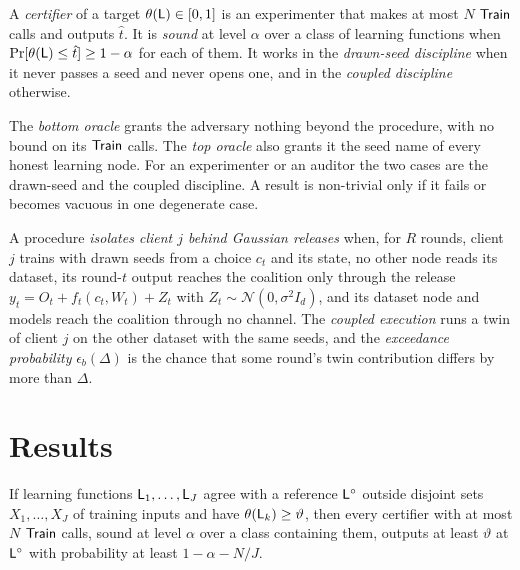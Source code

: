 \begin{definition}[Certifier]
A \emph{certifier} of a target $\theta(\mathsf{L})\in[0,1]$ is an experimenter that makes
at most $N$ $\mathsf{Train}$ calls and outputs $\hat t$. It is \emph{sound} at level
$\alpha$ over a class of learning functions when $\Pr[\theta(\mathsf{L})\le\hat t]\ge1-\alpha$
for each of them. It works in the \emph{drawn-seed discipline} when it never
passes a seed and never opens one, and in the \emph{coupled discipline} otherwise.
\end{definition}

\begin{definition}
The \emph{bottom oracle} grants the adversary nothing beyond the procedure, with
no bound on its $\mathsf{Train}$ calls. The \emph{top oracle} also grants it the seed name
of every honest learning node. For an experimenter or an auditor the two cases
are the drawn-seed and the coupled discipline. A result is non-trivial only if it
fails or becomes vacuous in one degenerate case.
\end{definition}

\begin{definition}
A procedure \emph{isolates client $j$ behind Gaussian releases} when, for $R$
rounds, client $j$ trains with drawn seeds from a choice $c_t$ and its state, no
other node reads its dataset, its round-$t$ output reaches the coalition only
through the release $y_t=O_t+f_t(c_t,W_t)+Z_t$ with $Z_t\sim\mathcal N(0,\sigma^2I_d)$,
and its dataset node and models reach the coalition through no channel. The
\emph{coupled execution} runs a twin of client $j$ on the other dataset with the
same seeds, and the \emph{exceedance probability} $\epsilon_b(\Delta)$ is the chance
that some round's twin contribution differs by more than $\Delta$.
\end{definition}

\section{Results}

\begin{lemma}
If learning functions $\mathsf{L}_1,\dots,\mathsf{L}_J$ agree with a reference $\mathsf{L}^\circ$ outside
disjoint sets $X_1,\dots,X_J$ of training inputs and have $\theta(\mathsf{L}_k)\ge\vartheta$,
then every certifier with at most $N$ $\mathsf{Train}$ calls, sound at level $\alpha$ over a
class containing them, outputs at least $\vartheta$ at $\mathsf{L}^\circ$ with probability at
least $1-\alpha-N/J$.
\end{lemma}

